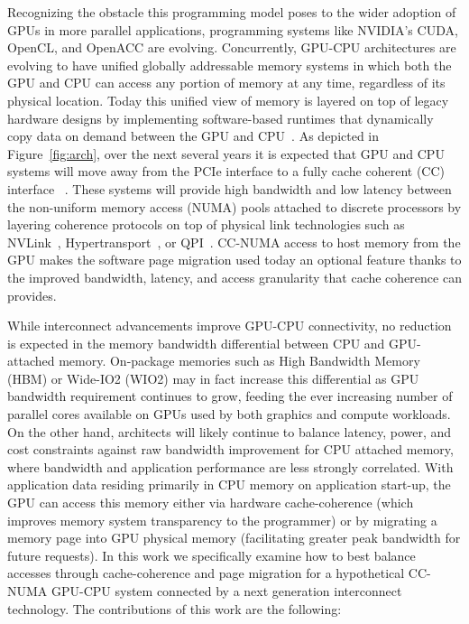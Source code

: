Recognizing the obstacle this programming model poses to the wider adoption of GPUs in more
parallel applications, programming 
systems like NVIDIA's CUDA, OpenCL, and OpenACC are evolving. Concurrently, GPU-CPU architectures are evolving to have unified
globally addressable memory systems in which both the GPU and CPU can access any portion of memory at any time, regardless
of its physical location.  Today this unified view of memory is layered on top of legacy hardware designs by implementing
software-based runtimes that dynamically copy data on demand between the GPU and
CPU~\cite{cuda}. As depicted in Figure~\ref{fig:arch}, over the next several years
it is expected that GPU and CPU systems will move away from the PCIe interface
to a fully cache coherent (CC) interface ~\cite{AMDHSA}. These systems will provide
high bandwidth and low latency between the non-uniform memory access (NUMA) pools attached to discrete
processors by layering coherence protocols on top of physical link technologies such as NVLink~\cite{NVLINK}, 
Hypertransport~\cite{AMDHT}, or QPI~\cite{INTELQPI}.   CC-NUMA access to host memory from the GPU makes the software page migration used today an
optional feature thanks to the improved bandwidth, latency, and access granularity that cache coherence can provides.

While interconnect advancements improve GPU-CPU connectivity, no reduction is expected in the memory
bandwidth differential between CPU and GPU-attached memory.  On-package memories such as High Bandwidth
Memory (HBM) or Wide-IO2 (WIO2) may in fact increase this differential as GPU
bandwidth requirement continues to grow, feeding the ever increasing number of parallel cores available
on GPUs used by both graphics and compute workloads. On the other hand, architects will likely continue to balance 
latency, power, and cost constraints against raw bandwidth improvement for CPU attached memory, where bandwidth and application performance
are less strongly correlated. With application data
residing primarily in CPU memory on application start-up, the GPU can access this memory either via hardware cache-coherence (which improves
memory system transparency to the programmer) or 
by migrating a memory page into GPU physical memory (facilitating greater peak bandwidth for future requests). In this work we specifically examine how to best balance accesses
through cache-coherence and page migration for a hypothetical CC-NUMA GPU-CPU system connected
by a next generation interconnect technology.  The contributions of this work
are the following:


